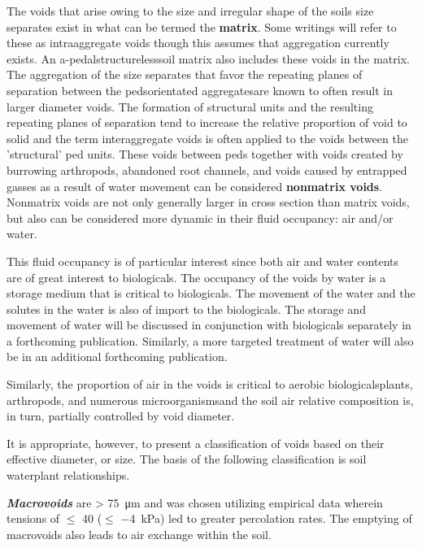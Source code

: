\documentclass{book}
\begin{document}
The voids that arise owing to the size and irregular shape of the soils size separates exist in what can be termed the \textbf{matrix}. Some writings will refer to these as intraaggregate voids though this assumes that aggregation currently exists. An a-pedal\textemdash{}structureless\textemdash{}soil matrix also includes these voids in the matrix. The aggregation of the size separates that favor the repeating planes of separation between the peds\textemdash{}orientated aggregates\textemdash{}are known to often result in larger diameter voids. The formation of structural units and the resulting repeating planes of separation tend to increase the relative proportion of void to solid and the term interaggregate voids is often applied to the voids between the 'structural' ped units. These voids between peds together with voids created by burrowing arthropods, abandoned root channels, and voids caused by entrapped gasses as a result of water movement can be considered \textbf{nonmatrix voids}. Nonmatrix voids are not only generally larger in cross section than matrix voids, but also can be considered more dynamic in their fluid occupancy: air and/or water.  


This fluid occupancy is of particular interest since both air and water contents are of great interest to biologicals. The occupancy of the voids by water is a storage medium that is critical to biologicals. The movement of the water and the solutes in the water is also of import to the biologicals. The storage and movement of water will be discussed in conjunction with biologicals separately in a forthcoming publication. Similarly, a more targeted treatment of water will also be in an additional forthcoming publication.  

Similarly, the proportion of air in the voids is critical to aerobic biologicals\textemdash{}plants, arthropods, and numerous microorganisms\textemdash{}and the soil air relative composition is, in turn, partially controlled by void diameter.

It is appropriate, however, to present a classification of voids based on their effective diameter, or size. The basis of the following classification is soil water\textemdash{}plant relationships.  

\textbf{\textit{Macrovoids}} are \textgreater{} \qty{75}{\micro\metre} and was chosen utilizing empirical data wherein tensions of $\leq$ \qty{40}{} ($\leq$ \qty{-4}{kPa}) led to greater percolation rates. The emptying of macrovoids also leads to air exchange within the soil.  
\end{document}
